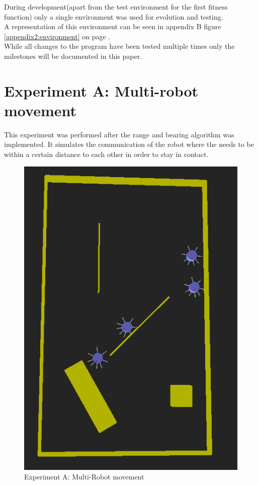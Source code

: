 During development(apart from the test environment for the first fitness function) only a single environment was used for evolution and testing.\\
A representation of this environment can be seen in appendix B figure \ref{appendix2:environment} on page \pageref{appendix2:environment}.\\
While all changes to the program have been tested multiple times only the milestones will be documented in this paper. \\

\section{Experiment A: Multi-robot movement}
This experiment was performed after the range and bearing algorithm was implemented. It simulates the communication of the robot where the needs to be within a certain distance to each other in order to stay in contact.\\

\begin{figure}[h]
\centering
\includegraphics[scale=0.5]{Chapter4/images/experiment_A.PNG}
\caption{Experiment A: Multi-Robot movement}
\label{fig:experiment_a}
\end{figure}

